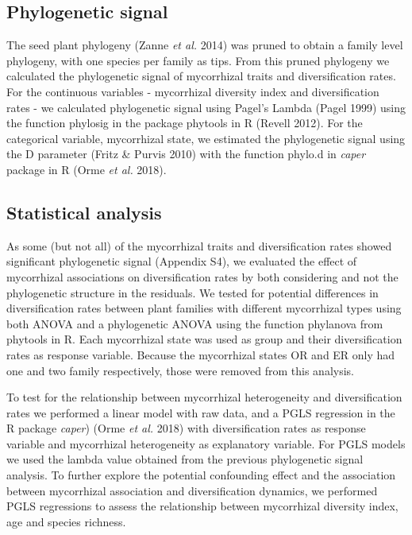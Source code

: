 \documentclass[12pt,]{article}
\begin{document}
\hypertarget{phylogenetic-signal}{%
\subsection{Phylogenetic signal}\label{phylogenetic-signal}}

The seed plant phylogeny (Zanne \emph{et al.} 2014) was pruned to obtain
a family level phylogeny, with one species per family as tips. From this
pruned phylogeny we calculated the phylogenetic signal of mycorrhizal
traits and diversification rates. For the continuous variables -
mycorrhizal diversity index and diversification rates - we calculated
phylogenetic signal using Pagel's Lambda (Pagel 1999) using the function
phylosig in the package phytools in R (Revell 2012). For the categorical
variable, mycorrhizal state, we estimated the phylogenetic signal using
the D parameter (Fritz \& Purvis 2010) with the function phylo.d in
\emph{caper} package in R (Orme \emph{et al.} 2018).

\hypertarget{statistical-analysis}{%
\subsection{Statistical analysis}\label{statistical-analysis}}

As some (but not all) of the mycorrhizal traits and diversification
rates showed significant phylogenetic signal (Appendix S4), we evaluated
the effect of mycorrhizal associations on diversification rates by both
considering and not the phylogenetic structure in the residuals. We
tested for potential differences in diversification rates between plant
families with different mycorrhizal types using both ANOVA and a
phylogenetic ANOVA using the function phylanova from phytools in R. Each
mycorrhizal state was used as group and their diversification rates as
response variable. Because the mycorrhizal states OR and ER only had one
and two family respectively, those were removed from this analysis.

To test for the relationship between mycorrhizal heterogeneity and
diversification rates we performed a linear model with raw data, and a
PGLS regression in the R package \emph{caper}) (Orme \emph{et al.} 2018)
with diversification rates as response variable and mycorrhizal
heterogeneity as explanatory variable. For PGLS models we used the
lambda value obtained from the previous phylogenetic signal analysis. To
further explore the potential confounding effect and the association
between mycorrhizal association and diversification dynamics, we
performed PGLS regressions to assess the relationship between
mycorrhizal diversity index, age and species richness.
\end{document}
